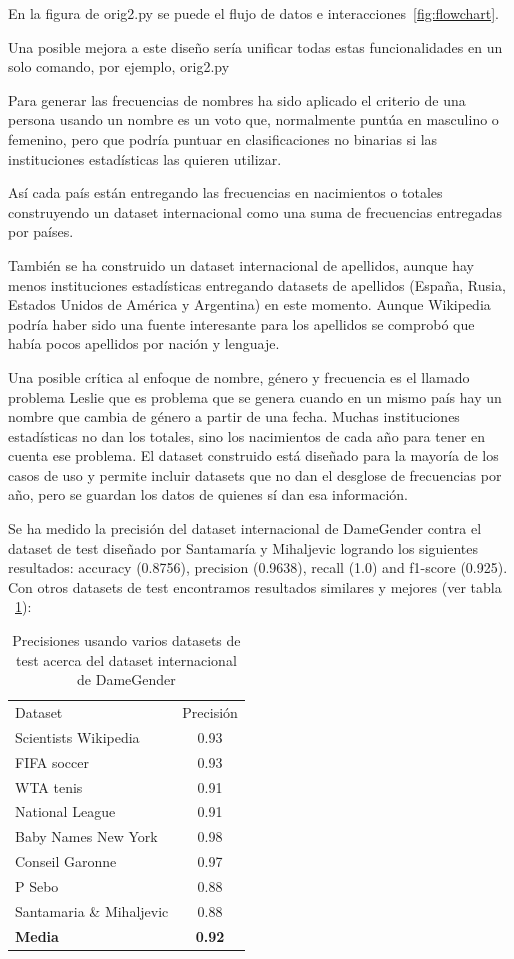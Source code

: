 \documentclass[a4paper]{article}
\begin{document}
En la figura de orig2.py se puede el flujo de datos e
interacciones~\ref{fig:flowchart}.

Una posible mejora a este diseño sería unificar todas estas funcionalidades
en un solo comando, por ejemplo, orig2.py

Para generar las frecuencias de nombres ha sido aplicado el criterio de una
persona usando un nombre es un voto que, normalmente puntúa en masculino o
femenino, pero que podría puntuar en clasificaciones no binarias si las
instituciones estadísticas las quieren utilizar.

Así cada país están entregando las frecuencias en nacimientos o totales
construyendo un dataset internacional como una suma de frecuencias entregadas
por países.

También se ha construido un dataset internacional de apellidos, aunque
hay menos instituciones estadísticas entregando datasets de apellidos
(España, Rusia, Estados Unidos de América y Argentina) en este momento.
Aunque Wikipedia podría haber sido una fuente interesante para los
apellidos se comprobó que había pocos apellidos por nación y lenguaje.

Una posible crítica al enfoque de nombre, género y frecuencia es el
llamado problema Leslie\cite{blevins2015jane} que es problema que se
genera cuando en un mismo país hay un nombre que cambia de género a
partir de una fecha. Muchas instituciones estadísticas no dan los
totales, sino los nacimientos de cada año para tener en cuenta ese
problema. El dataset construido está diseñado para la mayoría de los
casos de uso y permite incluir datasets que no dan el desglose de
frecuencias por año, pero se guardan los datos de quienes sí dan esa
información.

Se ha medido la precisión del dataset internacional de DameGender
contra el dataset de test diseñado por Santamaría y Mihaljevic\cite{10.7717/peerj-cs.156}
logrando los siguientes resultados: accuracy (0.8756), precision
(0.9638), recall (1.0) and f1-score (0.925). Con otros datasets
de test encontramos resultados similares y mejores
(ver tabla ~\ref{table:SeveralTests}):

\begin{table}[t]
  \footnotesize
  \begin{tabular}[]{lc}
    \hline
    Dataset & Precisión  \tabularnewline
    Scientists Wikipedia & 0.93 \tabularnewline
    FIFA soccer & 0.93 \tabularnewline
    WTA tenis & 0.91 \tabularnewline
    National League & 0.91 \tabularnewline
    Baby Names New York & 0.98 \tabularnewline    
    Conseil Garonne & 0.97 \tabularnewline
    P Sebo\cite{sebo2021performance} & 0.88 \tabularnewline
    Santamaria \& Mihaljevic\cite{10.7717/peerj-cs.156} & 0.88 \tabularnewline
    \textbf{Media} & \textbf{0.92} \tabularnewline    
  \end{tabular}
  \caption{Precisiones usando varios datasets de test acerca del dataset internacional de DameGender}
  \label{table:SeveralTests}
\end{table}
\end{document}
